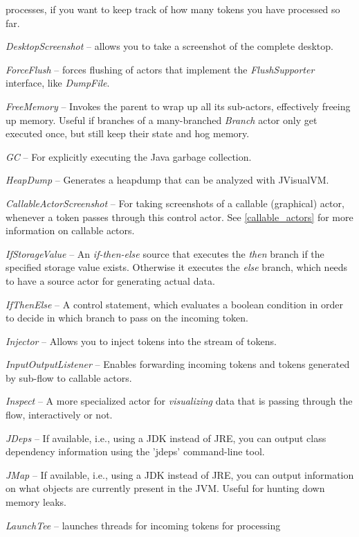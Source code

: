 \begin{tight_itemize}
	processes, if you want to keep track of how many tokens you have processed so
	far.
	\item \textit{DesktopScreenshot} -- allows you to take a screenshot
	of the complete desktop.
	\item \textit{ForceFlush} -- forces flushing of actors that implement
	the \textit{FlushSupporter} interface, like \textit{DumpFile}.
	\item \textit{FreeMemory} -- Invokes the parent to wrap up all its
	sub-actors, effectively freeing up memory. Useful if branches of a
	many-branched \textit{Branch} actor only get executed once, but still keep
	their state and hog memory.
	\item \textit{GC} -- For explicitly executing the Java garbage collection.
	\item \textit{HeapDump} -- Generates a heapdump that can be analyzed with JVisualVM.
	\item \textit{CallableActorScreenshot} -- For taking screenshots of a callable
	(graphical) actor, whenever a token passes through this control actor.
	See \ref{callable_actors} for more information on callable actors.
	\item \textit{IfStorageValue} -- An \textit{if-then-else} source that executes
	the \textit{then} branch if the specified storage value exists. Otherwise it
	executes the \textit{else} branch, which needs to have a source actor for
	generating actual data.
	\item \textit{IfThenElse} -- A control statement, which evaluates a boolean
	condition in order to decide in which branch to pass on the incoming token.
	\item \textit{Injector} -- Allows you to inject tokens into the stream of
	tokens.
	\item \textit{InputOutputListener} -- Enables forwarding incoming tokens
	and tokens generated by sub-flow to callable actors.
	\item \textit{Inspect} -- A more specialized actor for \textit{visualizing} data
	that is passing through the flow, interactively or not.
	\item \textit{JDeps} -- If available, i.e., using a JDK instead of JRE, you can
	output class dependency information using the 'jdeps' command-line tool.
	\item \textit{JMap} -- If available, i.e., using a JDK instead of JRE, you can
	output information on what objects are currently present in the JVM. Useful for
	hunting down memory leaks.
	\item \textit{LaunchTee} -- launches threads for incoming tokens for processing

\end{tight_itemize}

